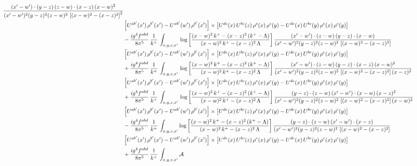 \documentclass[9pt]{article}
\numberwithin{equation}{section}
\begin{document}
\begin{align}
\frac{(x'-w')\cdot(y-z)\,(z-w)\cdot(x-z)\,(x-w)^{2}}{(x'-w')^{2}(y-z)^{2}(z-w)^{2}\,\left[(x-w)^{2}-(x-z)^{2}\right]^{2}}\notag \\ 
&\left[U^{ab'}(x')\,\rho^{b'}(x')-U^{ab'}(w')\, \rho^{b'}(x')\right]\times \left[U^{de}(x)\,U^{bc}(z)\, \rho^{e}(x)\,\rho^{c}(y)-U^{de}(x)\,U^{bc}(y)\,\rho^{e}(x)\,\rho^{c}(y)\right]\notag \\ & -\frac{ig^{4}f^{abd}}{8\pi^{5}}\,\frac{1}{k^{+}}\,\int_{x,y,z,x'}\,\log{\left[\frac{(x-w)^{2}\,k^{+}-(x-z)^{2}\,(k^{+}-\Lambda)}{(x-w)^{2}\,k^{+}-(x-z)^{2}\,\Lambda}\right]}\,
\frac{(x'-w')\cdot(z-w)\,(y-z)\cdot(x-w)}{(x'-w')^{2}(y-z)^{2}(z-w)^{2}\,\left[(x-w)^{2}-(x-z)^{2}\right]}\notag \\ & \left[U^{ab'}(x')\,\rho^{b'}(x')-U^{ab'}(w')\, \rho^{b'}(x')\right]\times \left[U^{de}(x)\,U^{bc}(z)\, \rho^{e}(x)\,\rho^{c}(y)-U^{de}(x)\,U^{bc}(y)\,\rho^{e}(x)\,\rho^{c}(y)\right]\notag \\ &  +\frac{ig^{4}f^{abd}}{8\pi^{5}}\,\frac{1}{k^{+}}\,\int_{x,y,z,x'}\,\log{\left[\frac{(x-w)^{2}\,k^{+}-(x-z)^{2}\,(k^{+}-\Lambda)}{(x-w)^{2}\,k^{+}-(x-z)^{2}\,\Lambda}\right]}\,
\frac{(x'-w')\cdot(z-w)\,(y-z)\cdot(x-z)\,(x-w)^{2}}{(x'-w')^{2}(y-z)^{2}(z-w)^{2}\,\left[(x-w)^{2}-(x-z)^{2}\right](x-z)^{2}}\notag \\ & \left[U^{ab'}(x')\,\rho^{b'}(x')-U^{ab'}(w')\, \rho^{b'}(x')\right]\times \left[U^{de}(x)\,U^{bc}(z)\, \rho^{e}(x)\,\rho^{c}(y)-U^{de}(x)\,U^{bc}(y)\,\rho^{e}(x)\,\rho^{c}(y)\right]\notag \\ & +\frac{ig^{4}f^{abd}}{8\pi^{5}}\,\frac{1}{k^{+}}\,\int_{x,y,z,x'}\,\log{\left[\frac{(x-w)^{2}\,k^{+}-(x-z)^{2}\,(k^{+}-\Lambda)}{(x-w)^{2}\,k^{+}-(x-z)^{2}\,\Lambda}\right]}\,
\frac{(y-z)\cdot(z-w)\,(x'-w')\cdot(x-w)\,(x-z)^{2}}{(x'-w')^{2}(y-z)^{2}(z-w)^{2}\,\left[(x-w)^{2}-(x-z)^{2}\right](x-w)^{2}}\notag \\ 
& \left[U^{ab'}(x')\,\rho^{b'}(x')-U^{ab'}(w')\, \rho^{b'}(x')\right]\times \left[U^{de}(x)\,U^{bc}(z)\, \rho^{e}(x)\,\rho^{c}(y)-U^{de}(x)\,U^{bc}(y)\,\rho^{e}(x)\,\rho^{c}(y)\right]\notag \\ & -\frac{ig^{4}f^{abd}}{8\pi^{5}}\,\frac{1}{k^{+}}\,\int_{x,y,z,x'}\log{\left[\frac{(x-w)^{2}\,k^{+}-(x-z)^{2}\,(k^{+}-\Lambda)}{(x-w)^{2}\,k^{+}-(x-z)^{2}\,\Lambda}\right]}\,
\frac{(y-z)\cdot(z-w)\,(x'-w')\cdot(x-z)}{(x'-w')^{2}(y-z)^{2}(z-w)^{2}\,\left[(x-w)^{2}-(x-z)^{2}\right]}\notag \\ & \left[U^{ab'}(x')\,\rho^{b'}(x')-U^{ab'}(w')\, \rho^{b'}(x')\right]\times \left[U^{de}(x)\,U^{bc}(z)\, \rho^{e}(x)\,\rho^{c}(y)-U^{de}(x)\,U^{bc}(y)\,\rho^{e}(x)\,\rho^{c}(y)\right]\notag \\ & +\frac{ig^{4}f^{abd}}{8\pi^{5}}\,\frac{1}{k^{+}}\,\int_{x,y,z,x'}\mathcal{A}\,

\end{align}
\end{document}
